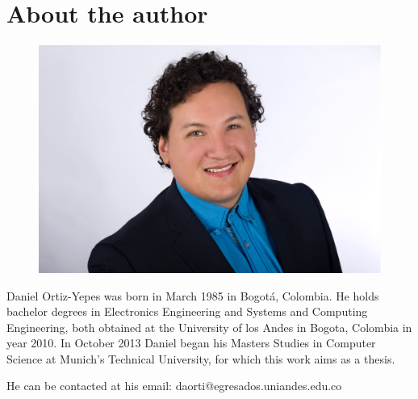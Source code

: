 \chapter{About the author}
\thispagestyle{empty}


\begin{figure}[ht]
\hspace{75mm}
		\includegraphics[width=.4\textwidth]{figures/dortiz-portrait.eps}
		\label{fig:me}
\end{figure}

\vspace{15mm}

Daniel Ortiz-Yepes was born in March 1985 in Bogot\'a, Colombia. He holds bachelor degrees in Electronics Engineering and Systems and Computing Engineering, both obtained at the University of los Andes in Bogota, Colombia in year 2010. In October 2013 Daniel began his Masters Studies in Computer Science at Munich's Technical University, for which this work aims as a thesis. 

\vspace{20mm}
\begin{flushright}
He can be contacted at his email: daorti@egresados.uniandes.edu.co
\end{flushright}


\vspace{1cm}
